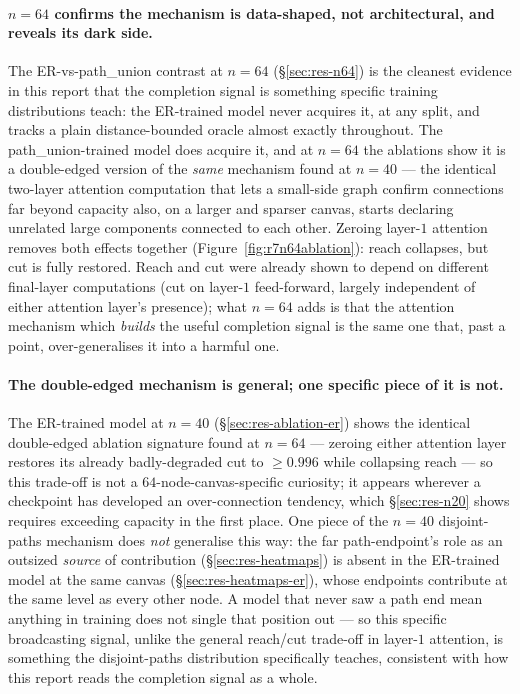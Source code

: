 \documentclass[11pt,a4paper]{article}
\begin{document}
\paragraph{$n=64$ confirms the mechanism is data-shaped, not architectural, and
reveals its dark side.} The ER-vs-path\_union contrast at $n=64$
(\S\ref{sec:res-n64}) is the cleanest evidence in this report that the
completion signal is something specific training distributions teach: the
ER-trained model never acquires it, at any split, and tracks a plain
distance-bounded oracle almost exactly throughout. The path\_union-trained
model does acquire it, and at $n=64$ the ablations show it is a double-edged
version of the \emph{same} mechanism found at $n=40$ --- the identical
two-layer attention computation that lets a small-side graph confirm
connections far beyond capacity also, on a larger and sparser canvas, starts
declaring unrelated large components connected to each other. Zeroing
layer-$1$ attention removes both effects together (Figure~\ref{fig:r7n64ablation}):
reach collapses, but cut is fully restored. Reach and cut were already shown
to depend on different final-layer computations (cut on layer-$1$
feed-forward, largely independent of either attention layer's presence); what
$n=64$ adds is that the attention mechanism which \emph{builds} the useful
completion signal is the same one that, past a point, over-generalises it into
a harmful one.

\paragraph{The double-edged mechanism is general; one specific piece of it is not.} The
ER-trained model at $n=40$ (\S\ref{sec:res-ablation-er}) shows the identical double-edged
ablation signature found at $n=64$ --- zeroing either attention layer restores its already
badly-degraded cut to $\ge0.996$ while collapsing reach --- so this trade-off is not a
$64$-node-canvas-specific curiosity; it appears wherever a checkpoint has developed an
over-connection tendency, which \S\ref{sec:res-n20} shows requires exceeding capacity in the
first place. One piece of the $n=40$ disjoint-paths mechanism does \emph{not} generalise this
way: the far path-endpoint's role as an outsized \emph{source} of contribution
(\S\ref{sec:res-heatmaps}) is absent in the ER-trained model at the same canvas
(\S\ref{sec:res-heatmaps-er}), whose endpoints contribute at the same level as every other
node. A model that never saw a path end mean anything in training does not single that
position out --- so this specific broadcasting signal, unlike the general reach/cut trade-off
in layer-$1$ attention, is something the disjoint-paths distribution specifically teaches,
consistent with how this report reads the completion signal as a whole.
\end{document}
